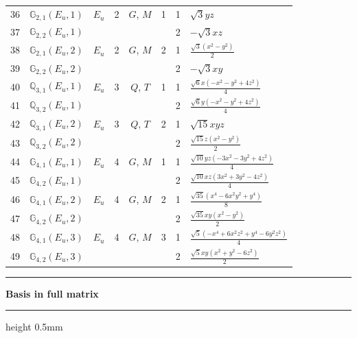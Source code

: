 \documentclass[fleqn,10pt,landscape]{jsarticle}
\begin{document}
\begin{longtable}[l]{clcccccl}
36 & $\mathbb{G}_{2,1}(E_{u},1)$ & $E_{u}$ & 2 & $G$, $M$ & 1 & 1 & $\sqrt{3} y z$ \\
37 & $\mathbb{G}_{2,2}(E_{u},1)$ &  &  &  &  & 2 & $- \sqrt{3} x z$ \\ \hline
38 & $\mathbb{G}_{2,1}(E_{u},2)$ & $E_{u}$ & 2 & $G$, $M$ & 2 & 1 & $\frac{\sqrt{3} \left(x^{2} - y^{2}\right)}{2}$ \\
39 & $\mathbb{G}_{2,2}(E_{u},2)$ &  &  &  &  & 2 & $- \sqrt{3} x y$ \\ \hline
40 & $\mathbb{Q}_{3,1}(E_{u},1)$ & $E_{u}$ & 3 & $Q$, $T$ & 1 & 1 & $\frac{\sqrt{6} x \left(- x^{2} - y^{2} + 4 z^{2}\right)}{4}$ \\
41 & $\mathbb{Q}_{3,2}(E_{u},1)$ &  &  &  &  & 2 & $\frac{\sqrt{6} y \left(- x^{2} - y^{2} + 4 z^{2}\right)}{4}$ \\ \hline
42 & $\mathbb{Q}_{3,1}(E_{u},2)$ & $E_{u}$ & 3 & $Q$, $T$ & 2 & 1 & $\sqrt{15} x y z$ \\
43 & $\mathbb{Q}_{3,2}(E_{u},2)$ &  &  &  &  & 2 & $\frac{\sqrt{15} z \left(x^{2} - y^{2}\right)}{2}$ \\ \hline
44 & $\mathbb{G}_{4,1}(E_{u},1)$ & $E_{u}$ & 4 & $G$, $M$ & 1 & 1 & $\frac{\sqrt{10} y z \left(- 3 x^{2} - 3 y^{2} + 4 z^{2}\right)}{4}$ \\
45 & $\mathbb{G}_{4,2}(E_{u},1)$ &  &  &  &  & 2 & $\frac{\sqrt{10} x z \left(3 x^{2} + 3 y^{2} - 4 z^{2}\right)}{4}$ \\ \hline
46 & $\mathbb{G}_{4,1}(E_{u},2)$ & $E_{u}$ & 4 & $G$, $M$ & 2 & 1 & $\frac{\sqrt{35} \left(x^{4} - 6 x^{2} y^{2} + y^{4}\right)}{8}$ \\
47 & $\mathbb{G}_{4,2}(E_{u},2)$ &  &  &  &  & 2 & $\frac{\sqrt{35} x y \left(x^{2} - y^{2}\right)}{2}$ \\ \hline
48 & $\mathbb{G}_{4,1}(E_{u},3)$ & $E_{u}$ & 4 & $G$, $M$ & 3 & 1 & $\frac{\sqrt{5} \left(- x^{4} + 6 x^{2} z^{2} + y^{4} - 6 y^{2} z^{2}\right)}{4}$ \\
49 & $\mathbb{G}_{4,2}(E_{u},3)$ &  &  &  &  & 2 & $\frac{\sqrt{5} x y \left(x^{2} + y^{2} - 6 z^{2}\right)}{2}$ \\
\end{longtable}
\vspace{5mm}
\noindent \rule[0.5mm]{5mm}{0.5mm}\hspace{3mm}\textbf{Basis in full matrix}\hspace{3mm}\leaders\hrule height 0.5mm\hfill\kern0pt
\vspace{3mm}
\end{document}

